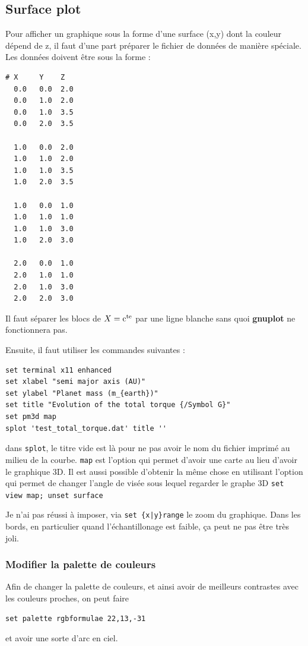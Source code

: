 \documentclass[a4paper,twoside]{article}
\begin{document}
\subsection{Surface plot}
Pour afficher un graphique sous la forme d'une surface (x,y) dont la couleur dépend de z, il faut d'une part préparer le fichier de données de manière spéciale. Les données doivent être sous la forme : 
\begin{verbatim}
# X     Y    Z
  0.0   0.0  2.0
  0.0   1.0  2.0
  0.0   1.0  3.5
  0.0   2.0  3.5

  1.0   0.0  2.0
  1.0   1.0  2.0
  1.0   1.0  3.5
  1.0   2.0  3.5

  1.0   0.0  1.0
  1.0   1.0  1.0
  1.0   1.0  3.0
  1.0   2.0  3.0

  2.0   0.0  1.0
  2.0   1.0  1.0
  2.0   1.0  3.0
  2.0   2.0  3.0
\end{verbatim}

\begin{attention}
Il faut séparer les blocs de $X=\mathrm{c^{te}}$ par une ligne blanche sans quoi \textbf{gnuplot} ne fonctionnera pas.
\end{attention}


Ensuite, il faut utiliser les commandes suivantes :
\begin{verbatim}
set terminal x11 enhanced
set xlabel "semi major axis (AU)"
set ylabel "Planet mass (m_{earth})"
set title "Evolution of the total torque {/Symbol G}"
set pm3d map
splot 'test_total_torque.dat' title ''
\end{verbatim}
dans \texttt{splot}, le titre vide est là pour ne pas avoir le nom du fichier imprimé au milieu de la courbe. \texttt{map} est l'option qui permet d'avoir une carte au lieu d'avoir le graphique 3D. Il est aussi possible d'obtenir la même chose en utilisant l'option qui permet de changer l'angle de visée sous lequel regarder le graphe 3D \texttt{set view map; unset surface}

\begin{remarque}
Je n'ai pas réussi à imposer, via \verb#set {x|y}range# le zoom du graphique. Dans les bords, en particulier quand l'échantillonage est faible, ça peut ne pas être très joli. 
\end{remarque}

\subsubsection{Modifier la palette de couleurs}
Afin de changer la palette de couleurs, et ainsi avoir de meilleurs contrastes avec les couleurs proches, on peut faire 
\begin{verbatim}
set palette rgbformulae 22,13,-31
\end{verbatim}
et avoir une sorte d'arc en ciel.
\end{document}
